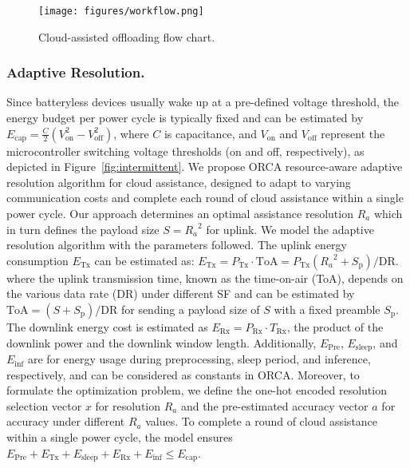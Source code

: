 \begin{figure}[tp]
    \centering
    \texttt{[image: figures/workflow.png]}
    \vspace{-0.5cm}
    \caption{Cloud-assisted offloading flow chart.}
    \label{fig:workflow}
    \vspace{-0.2cm}
\end{figure}

\noindent
\subsubsection{Adaptive Resolution.}
 Since batteryless devices usually wake up at a pre-defined voltage threshold, the energy budget per power cycle is typically fixed and can be estimated by $E_{\text{cap}}=\frac{C}{2}(V_{\text{on}}^2 - V_{\text{off}}^2)$, where $C$ is capacitance, and $V_{\text{on}}$ and $V_{\text{off}}$ represent the microcontroller switching voltage thresholds (on and off, respectively), as depicted in Figure~\ref{fig:intermittent}. 
We propose ORCA resource-aware adaptive resolution algorithm for cloud assistance, designed to adapt to varying communication costs and complete each round of cloud assistance within a single power cycle. Our approach determines an optimal assistance resolution $R_a$ which in turn defines the payload size $S={R_a}^2$ for uplink. We model the adaptive resolution algorithm with the parameters followed. The uplink energy consumption $E_{\text{Tx}}$ can be estimated as: $E_{\text{Tx}} = P_{\text{Tx}} \cdot \text{ToA} = P_{\text{Tx}} ({R_a}^2+S_{\text{p}})/\text{DR}$.
where the uplink transmission time, known as the time-on-air (ToA), depends on the various data rate (DR) under different SF and can be estimated by $\text{ToA} = (S + S_{\text{p}})/\text{DR}$ for sending a payload size of $S$ with a fixed preamble $S_{\text{p}}$. 
The downlink energy cost is estimated as $E_{\text{Rx}}=P_{\text{Rx}} \cdot T_{\text{Rx}}$, the product of the downlink power and the downlink window length. Additionally, $E_{\text{Pre}}$, $E_{\text{sleep}}$, and $E_{\text{inf}}$ are for energy usage during preprocessing, sleep period, and inference, respectively, and can be considered as constants in ORCA. Moreover, to formulate the optimization problem, we define the one-hot encoded resolution selection vector $x$ for resolution ${R_a}$ and the pre-estimated accuracy vector $a$ for accuracy under different ${R_a}$ values. To complete a round of cloud assistance within a single power cycle, the model ensures $E_{\text{Pre}} + E_{\text{Tx}} + E_{\text{sleep}} + E_{\text{Rx}} + E_{\text{inf}} \leq E_{\text{cap}}$. 
